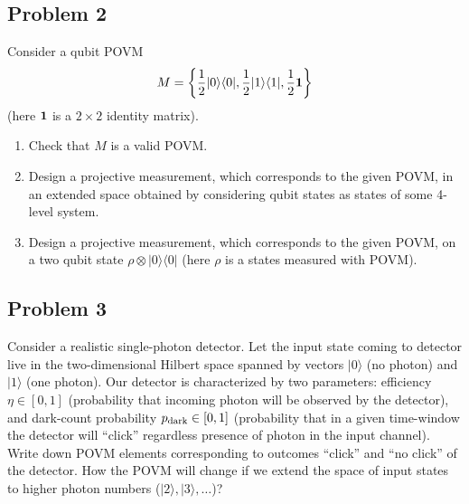 \documentclass[a4paper,10pt]{article}
\newcommand{\ket}[1]{|#1\rangle}
\newcommand{\bra}[1]{\langle#1|}
\begin{document}
\subsection*{Problem 2}
Consider a qubit POVM
\begin{equation}
	M = \left\{\frac{1}{2}\ket{0}\bra{0}, \frac{1}{2}\ket{1}\bra{1}, \frac{1}{2}{\bf 1}\right\}
\end{equation}
(here ${\bf 1}$ is a $2\times 2$ identity matrix).
\begin{enumerate}
	\item Check that $M$ is a valid POVM.
	\item Design a projective measurement, which corresponds to the given POVM, in an extended space obtained by considering qubit states as states of some 4-level system. 
	\item Design a projective measurement, which corresponds to the given POVM, on a two qubit state $\rho\otimes\ket{0}\bra{0}$ (here $\rho$ is a states measured with POVM).
\end{enumerate}

\subsection*{Problem 3}
Consider a realistic single-photon detector.
Let the input state coming to detector live in the two-dimensional Hilbert space spanned by vectors $\ket{0}$ (no photon) and $\ket{1}$ (one photon).
Our detector is characterized by two parameters: efficiency $\eta\in [0,1]$ (probability that incoming photon will be observed by the detector), and dark-count probability $p_{\rm dark}\in[0,1]$ (probability that in a given time-window the detector will ``click'' regardless presence of photon in the input channel).
Write down POVM elements corresponding to outcomes ``click'' and ``no click'' of the detector.
How the POVM will change if we extend the space of input states to higher photon numbers ($\ket{2}, \ket{3}, \ldots$)?
\end{document}
